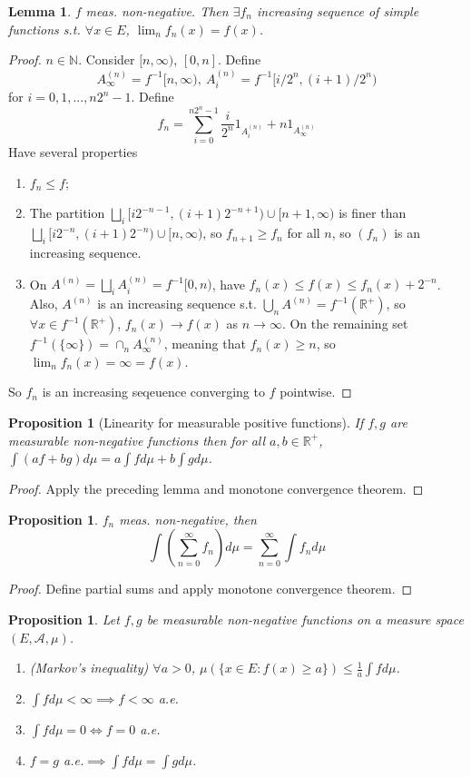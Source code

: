 \documentclass{article}
\theoremstyle{definition}
\theoremstyle{remark}
\theoremstyle{plain}
\newtheorem{prop}[defn]{Proposition}
\newtheorem{lem}[defn]{Lemma}
\newcommand{\NN}{\mathbb{N}}
\newcommand{\RR}{\mathbb{R}}
\begin{document}
\begin{lem}
    $f$ meas. non-negative. Then $\exists f_n$ increasing sequence of simple functions s.t. $\forall x\in E$, $\lim_n f_n(x)=f(x)$.
\end{lem}
\begin{proof}
    $n\in \NN$. Consider $[n,\infty)$, $[0,n]$.
    Define 
    \[A_\infty^{(n)}=f^{-1}[n,\infty),\ A_i^{(n)}=f^{-1}[i/2^n,(i+1)/2^n)\] for $i=0,1,...,n2^n-1$.
    Define
    \[f_n=\sum_{i=0}^{n2^n-1}\dfrac{i}{2^n}1_{A_i^{(n)}}+n1_{A_\infty^{(n)}}\]
    Have several properties
    \begin{enumerate}
        \item $f_n\le f$;
        \item The partition $\bigsqcup_i[i2^{-n-1},(i+1)2^{-n+1})\cup [n+1,\infty)$ is finer than $\bigsqcup_i[i2^{-n},(i+1)2^{-n})\cup[n,\infty)$, so $f_{n+1}\ge f_n$ for all $n$, so $(f_n)$ is an increasing sequence.
        \item On $A^{(n)}=\bigsqcup_iA_i^{(n)}=f^{-1}[0,n)$, have $f_n(x)\le f(x)\le f_n(x)+2^{-n}$. Also, $A^{(n)}$ is an increasing sequence s.t. $\bigcup_n A^{(n)}=f^{-1}(\RR^+)$, so $\forall x\in f^{-1}(\RR^+)$, $f_n(x)\to f(x)$ as $n\to\infty$. On the remaining set $f^{-1}(\{\infty\})=\cap_nA_\infty^{(n)}$, meaning that $f_n(x)\ge n$, so $\lim_nf_n(x)=\infty=f(x)$.
    \end{enumerate}
    So $f_n$ is an increasing seqeuence converging to $f$ pointwise.
\end{proof}
\begin{prop}[Linearity for measurable positive functions]
    If $f,g$ are measurable non-negative functions then for all $a,b\in\RR^+$, $\int (af+bg)d\mu=a\int fd\mu+b\int gd\mu$.
\end{prop}
\begin{proof}
    Apply the preceding lemma and monotone convergence theorem.
\end{proof}
\begin{prop}
    $f_n$ meas. non-negative, then \[\int\left(\sum_{n=0}^\infty f_n\right) d\mu=\sum_{n=0}^\infty\int f_nd\mu\]
\end{prop}
\begin{proof}
    Define partial sums and apply monotone convergence theorem.
\end{proof}
\begin{prop}
    Let $f,g$ be measurable non-negative functions on a measure space $(E,\mathcal{A},\mu)$.
    \begin{enumerate}
        \item (Markov's inequality) $\forall a>0$, $\mu(\{x\in E:f(x)\ge a\})\le \frac{1}{a}\int fd\mu$.
        \item $\int fd\mu<\infty\implies f<\infty$ a.e.
        \item $\int fd\mu=0\Leftrightarrow f=0$ a.e.
        \item $f=g$ a.e.$\implies \int fd\mu=\int gd\mu$.
    \end{enumerate}
\end{prop}
\end{document}
